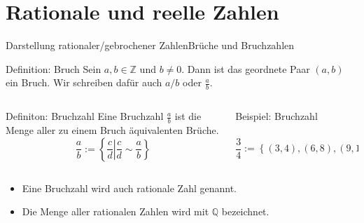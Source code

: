 \documentclass[xelatex,aspectratio=169]{beamer}
\begin{document}
\section{Rationale und reelle Zahlen}

\begin{frame}{Darstellung rationaler/gebrochener Zahlen}{Brüche und Bruchzahlen}
  \begin{block}{Definition: Bruch}
    Sein $a,b \in \mathbb{Z}$ und $b \neq 0$. Dann ist das geordnete Paar $(a,b)$ ein Bruch. Wir schreiben dafür auch $a/b$ oder $\frac{a}{b}$.
  \end{block}
  \begin{columns}[onlytextwidth]
    \begin{column}{0.39\textwidth}
      \begin{block}{Definiton: Bruchzahl}
        Eine Bruchzahl $\frac{a}{b}$ ist die Menge aller zu einem Bruch äquivalenten Brüche.
        \[
          \frac{a}{b} := \left\{ \left. \frac{c}{d} \right\rvert \frac{c}{d} \sim \frac{a}{b} \right\}
        \]

      \end{block}
    \end{column}
    \begin{column}{0.58\textwidth}
      \begin{exampleblock}{Beispiel: Bruchzahl}
        ~\\~
        \[
          \frac{3}{4} := \left\{ (3,4), (6,8), (9,12), \ldots \right\} = \left\{ \frac{3}{4}, \frac{6}{8}, \frac{9}{12}, \ldots \right\}
        \]

      \end{exampleblock}
    \end{column}
  \end{columns}
  \begin{itemize}
    \item Eine Bruchzahl wird auch rationale Zahl genannt.
    \item Die Menge aller rationalen Zahlen wird mit $\mathbb{Q}$ bezeichnet.
  \end{itemize}
\end{frame}
\end{document}
